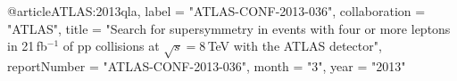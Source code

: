 @article{ATLAS:2013qla,
	  label = "ATLAS-CONF-2013-036",
    collaboration = "ATLAS",
    title = "{Search for supersymmetry in events with four or more leptons in 21$\,$fb$^{-1}$ of pp collisions at $\sqrt{s}=8\,$TeV with the ATLAS detector}",
    reportNumber = "ATLAS-CONF-2013-036",
    month = "3",
    year = "2013"
}

